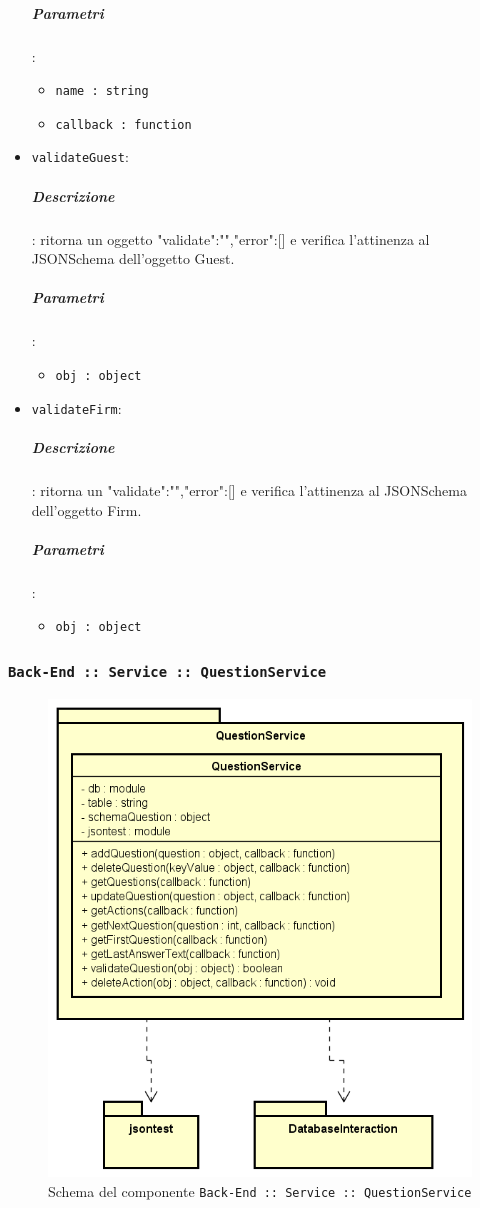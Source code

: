 \documentclass[../DefinizioneDiProdotto_v2.0.0.tex]{subfiles}
\begin{document}
\begin{itemize}
\subparagraph{Parametri}: \begin{itemize}
\item \texttt{name : string}
\item \texttt{callback : function}
\end{itemize}
\item \texttt{validateGuest}:
\subparagraph{Descrizione}: ritorna un oggetto {"validate":"","error":[]} e verifica l'attinenza al JSONSchema dell'oggetto Guest.
\subparagraph{Parametri}: \begin{itemize}
\item \texttt{obj : object}
\end{itemize}
\item \texttt{validateFirm}:
\subparagraph{Descrizione}: ritorna un {"validate":"","error":[]}  e verifica l'attinenza al JSONSchema dell'oggetto Firm.
\subparagraph{Parametri}: \begin{itemize}
\item \texttt{obj : object}
\end{itemize}
\end{itemize}
\newpage

\subsubsection{\texttt{Back-End :: Service :: QuestionService}}
\begin{figure}[!h]
	\centering
	\includegraphics[scale=0.6]{Architettura/Back-End/Service/QuestionService.png}
	\caption{Schema del componente \texttt{Back-End :: Service :: QuestionService}}
\end{figure}
\end{document}
